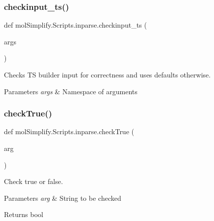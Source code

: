 \subsubsection{\texorpdfstring{checkinput\+\_\+ts()}{checkinput\_ts()}}
{\footnotesize\ttfamily def mol\+Simplify.\+Scripts.\+inparse.\+checkinput\+\_\+ts (\begin{DoxyParamCaption}\item[{}]{args }\end{DoxyParamCaption})}



Checks TS builder input for correctness and uses defaults otherwise. 


\begin{DoxyParams}{Parameters}
{\em args} & Namespace of arguments \\
\hline
\end{DoxyParams}
\mbox{\label{namespacemolSimplify_1_1Scripts_1_1inparse_a93d84b1ced5c90ff2d1e7a8bad01d1d3}} 
\subsubsection{\texorpdfstring{check\+True()}{checkTrue()}}
{\footnotesize\ttfamily def mol\+Simplify.\+Scripts.\+inparse.\+check\+True (\begin{DoxyParamCaption}\item[{}]{arg }\end{DoxyParamCaption})}



Check true or false. 


\begin{DoxyParams}{Parameters}
{\em arg} & String to be checked \\
\hline
\end{DoxyParams}
\begin{DoxyReturn}{Returns}
bool 
\end{DoxyReturn}
\mbox{\label{namespacemolSimplify_1_1Scripts_1_1inparse_a9929bff732d871d6d76946753dfc078d}} 
